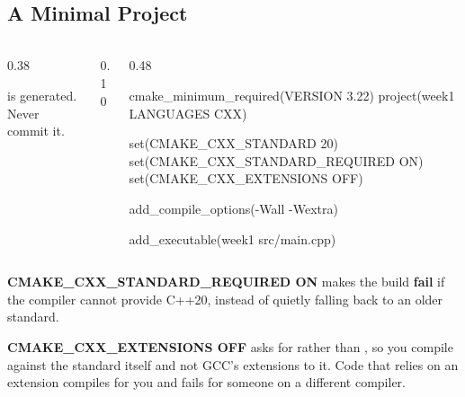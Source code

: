 \documentclass[
    10pt,
    dvipsnames,
    svgnames,
    x11names,
    aspectratio=1610,
    english,
    codeminted]{beamer}
\begin{document}
\subsection*{A Minimal Project}
\begingroup
\divframetrue
\renewcommand{\divbartextA}{\secname}
\renewcommand{\divbartextB}{}
\begin{frame}{\secname}
  \divbar{\secname}{\subsecname}
  \framesubtitle{\subsecname}

\begin{columns}[T,onlytextwidth]
\begin{column}{0.38\textwidth}

{\small
{}
}

\begin{compactitem}
\footnotesize
    \item {} is generated. Never commit it.
\end{compactitem}
\end{column}
\begin{column}{0.10\textwidth}
\end{column}
\begin{column}{0.48\textwidth}
\begin{cmakecodebasic}[][fontsize=\scriptsize]
cmake_minimum_required(VERSION 3.22)
project(week1 LANGUAGES CXX)

set(CMAKE_CXX_STANDARD 20)
set(CMAKE_CXX_STANDARD_REQUIRED ON)
set(CMAKE_CXX_EXTENSIONS OFF)

add_compile_options(-Wall -Wextra)

add_executable(week1 src/main.cpp)
\end{cmakecodebasic}
\end{column}
\end{columns}

\medskip
\begin{MyBox}
\begin{compactitem}
    \item \textbf{CMAKE_CXX_STANDARD_REQUIRED ON} makes the build \textbf{fail} if the compiler cannot provide C++20, instead of quietly falling back to an older standard.
     \item \textbf{CMAKE_CXX_EXTENSIONS OFF} asks for  rather than , so you compile against the standard itself and not GCC's extensions to it. Code that relies on an extension compiles for you and fails for someone on a different compiler.
\end{compactitem}

\end{MyBox}
\end{frame}
\endgroup
\end{document}
